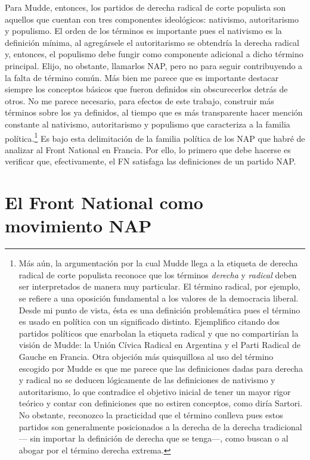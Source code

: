 Para Mudde, entonces, los partidos de derecha radical de corte populista son aquellos que cuentan con tres componentes ideológicos: nativismo, autoritarismo y populismo. El orden de los términos es importante pues el nativismo es la definición mínima, al agregársele el autoritarismo se obtendría la derecha radical y, entonces, el populismo debe fungir como componente adicional a dicho término principal. Elijo, no obstante, llamarlos NAP, pero no para seguir contribuyendo a la falta de término común. Más bien me parece que es importante destacar siempre los conceptos básicos que fueron definidos sin obscurecerlos detrás de otros. No me parece necesario, para efectos de este trabajo, construir más términos sobre los ya definidos, al tiempo que es más transparente hacer mención constante al nativismo, autoritarismo y populismo que caracteriza a la familia política.\footnote{Más aún, la argumentación por la cual Mudde llega a la etiqueta de derecha radical de corte populista reconoce que los términos \textit{derecha} y \textit{radical} deben ser interpretados de manera muy particular. El término radical, por ejemplo, se refiere a una oposición fundamental a los valores de la democracia liberal. Desde mi punto de vista, ésta es una definición problemática pues el término es usado en política con un significado distinto. Ejemplifico citando dos partidos políticos que enarbolan la etiqueta radical y que no compartirían la visión de Mudde: la Unión Cívica Radical en Argentina y el Parti Radical de Gauche en Francia. Otra objeción más quisquillosa al uso del término escogido por Mudde es que me parece que las definiciones dadas para derecha y radical no se deducen lógicamente de las definiciones de nativismo y autoritarismo, lo que contradice el objetivo inicial de tener un mayor rigor teórico y contar con definiciones que no estiren conceptos, como diría Sartori. No obstante, reconozco la practicidad que el término conlleva pues estos partidos son generalmente posicionados a la derecha de la derecha tradicional--- sin importar la definición de derecha que se tenga---, como buscan \textcite{Mammone12} o \textcite{Hainsworth16a} al abogar por el término derecha extrema.} Es bajo esta delimitación de la familia política de los NAP que habré de analizar al Front National en Francia. Por ello, lo primero que debe hacerse es verificar que, efectivamente, el FN satisfaga las definiciones de un partido NAP.\\ 

\section{El Front National como movimiento NAP}

